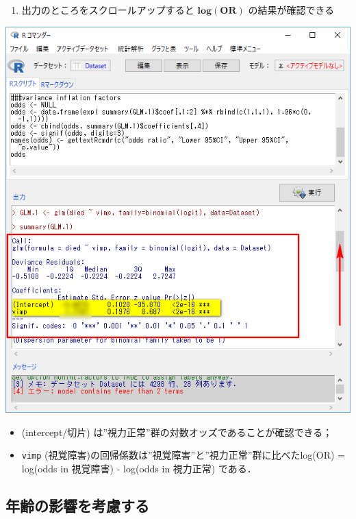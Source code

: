 \documentclass[11pt,]{problemset}
\providecommand{\tightlist}{%
  \setlength{\itemsep}{0pt}\setlength{\parskip}{0pt}}
\begin{document}
\begin{enumerate}
\def\labelenumi{\arabic{enumi}.}
\setcounter{enumi}{9}
\tightlist
\item
  出力のところをスクロールアップすると \(\mathbf{log(OR)}\)
  の結果が確認できる
\end{enumerate}

\begin{center}\includegraphics[width=0.52\linewidth]{pic/logstic09cut} \end{center}

\begin{itemize}
\tightlist
\item
  (intercept/切片) は''視力正常''群の対数オッズであることが確認できる；
\item
  \texttt{vimp}
  (視覚障害)の回帰係数は''視覚障害''と''視力正常''群に比べた\newline log(OR)
  = log(odds in 視覚障害) - log(odds in 視力正常) である．
\end{itemize}

\subsection{年齢の影響を考慮する}
\end{document}
